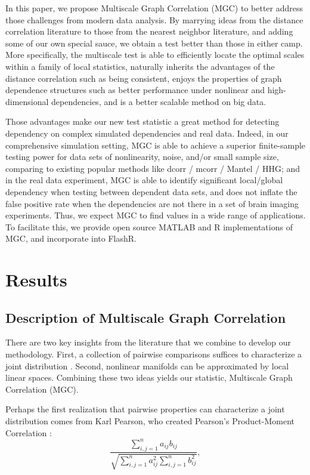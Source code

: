 \documentclass[11pt]{article}
\begin{document}
In this paper, we propose Multiscale Graph Correlation (MGC) to better address those challenges from modern data analysis. By marrying ideas from the distance correlation literature to those from the nearest neighbor literature, and adding some of our own special sauce, we obtain a test better than those in either camp.  More specifically,  the multiscale test is able to efficiently locate the optimal scales within a family of local statistics, naturally inherits the advantages of the distance correlation such as being consistent, enjoys the properties of graph dependence structures such as better performance under nonlinear and high-dimensional dependencies, and is a better scalable method on big data. 

Those advantages make our new test statistic a great method for detecting dependency on complex simulated dependencies and real data. Indeed, in our comprehensive simulation setting, MGC is able to achieve a superior finite-sample testing power for data sets of nonlinearity, noise, and/or small sample size, comparing to existing popular methods like dcorr / mcorr / Mantel / HHG; and in the real data experiment, MGC is able to identify significant local/global dependency when testing between dependent data sets,  and does not inflate the false positive rate when the dependencies are not there in a set of brain imaging experiments. Thus, we expect MGC to find values in a wide range of applications.  To facilitate this, we provide open source MATLAB and R implementations of MGC, and incorporate into FlashR.

\section{Results}
\label{main}
\subsection{Description of Multiscale Graph Correlation}
\label{main1}
There are two key insights from the literature that we combine to develop our methodology.  First, a collection of pairwise comparisons  suffices to characterize a joint distribution \cite{Maa1996}.  Second, nonlinear manifolds can be approximated by local linear spaces.  Combining these two ideas yields our statistic,  Multiscale Graph Correlation (MGC).  

Perhaps the first realization that pairwise properties can characterize a joint distribution comes from  Karl Pearson, who created Pearson's Product-Moment Correlation \cite{Pearson1895}:
\begin{equation}
\label{generalCoef}
\frac{\sum_{i,j=1}^n a_{ij} b_{ij}}{\sqrt{\sum_{i,j=1}^n  a_{ij}^{2} \sum_{i,j=1}^n b_{ij}^{2}}}, 
\end{equation}
\end{document}
